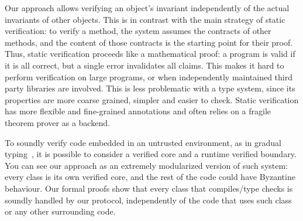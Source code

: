 




{}
Our approach allows verifying an object's invariant independently of the actual invariants of other objects.
This is in contrast with the main strategy of static verification: to verify a method, the system assumes the contracts of other methods, and the content of those contracts is the starting point for their proof.
Thus, static verification proceeds like a mathematical proof: a program is valid if it is all correct, but a single error invalidates all claims. This makes it hard to perform verification on large programs, or when independently maintained third party libraries are involved.
This is less problematic with a type system, since its properties are more coarse grained, simpler and easier to check.
 Static verification has more flexible and fine-grained annotations and often relies on a fragile theorem prover as a backend.

To soundly verify code embedded in an untrusted environment, as in gradual typing~\cite{DBLP:conf/oopsla/TakikawaSDTF12,DBLP:conf/popl/WrigstadNLOV10}, it is possible to 
consider a verified core and a runtime verified boundary.
You can see our approach as an extremely modularized	version of such system: every class is its
own verified core, and the rest of the code could have Byzantine behaviour. Our formal proofs show that every class that compiles/type checks is 
soundly handled by our protocol, independently of the code that uses such class or any other surrounding code.

